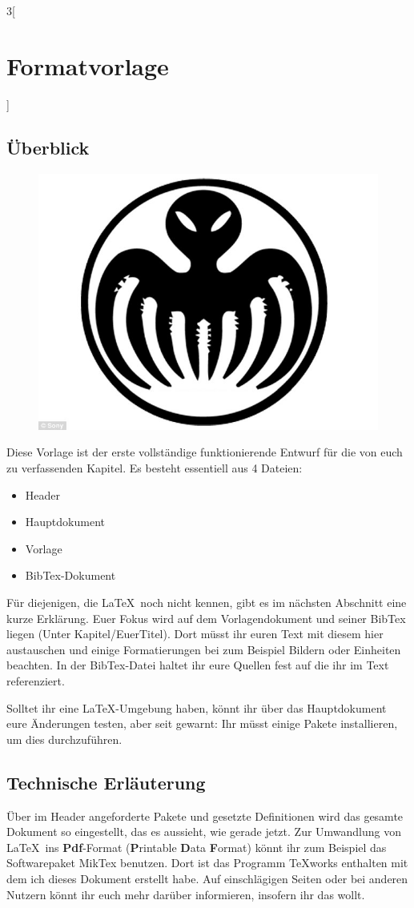 \begin{multicols}{3}[\section{Formatvorlage}]
\subsection*{Überblick}
\begin{figure}
  \vspace{-20pt}
  \begin{center}
  	\hspace{-20pt}
    \includegraphics[width=0.7\linewidth]{Kapitel/Vorlage/Grafiken/logo.jpg}
  \end{center}
  \vspace{-15pt}
\end{figure}
Diese Vorlage ist der erste vollständige funktionierende Entwurf für die von euch zu verfassenden Kapitel. Es besteht essentiell aus 4 Dateien:
\begin{itemize}
	\item Header
	\item Hauptdokument
	\item Vorlage
	\item BibTex-Dokument
\end{itemize}

Für diejenigen, die \LaTeX~noch nicht kennen, gibt es im nächsten Abschnitt eine kurze Erklärung. Euer Fokus wird auf dem Vorlagendokument und seiner BibTex liegen (Unter Kapitel/EuerTitel). Dort müsst ihr euren Text mit diesem hier austauschen und einige Formatierungen bei zum Beispiel Bildern oder Einheiten beachten. In der BibTex-Datei haltet ihr eure Quellen fest auf die ihr im Text referenziert. 

Solltet ihr eine \LaTeX-Umgebung haben, könnt ihr über das Hauptdokument eure Änderungen testen, aber seit gewarnt: Ihr müsst einige Pakete installieren, um dies durchzuführen.

\subsection*{Technische Erläuterung}
Über im Header angeforderte Pakete und gesetzte Definitionen wird das gesamte Dokument so eingestellt, das es aussieht, wie gerade jetzt. Zur Umwandlung von \LaTeX~ins \textbf{Pdf}-Format (\textbf{P}rintable \textbf{D}ata \textbf{F}ormat) könnt ihr zum Beispiel das Softwarepaket MikTex benutzen. Dort ist das Programm TeXworks enthalten mit dem ich dieses Dokument erstellt habe. Auf einschlägigen Seiten oder bei anderen Nutzern könnt ihr euch mehr darüber informieren, insofern ihr das wollt. 


\end{multicols}
